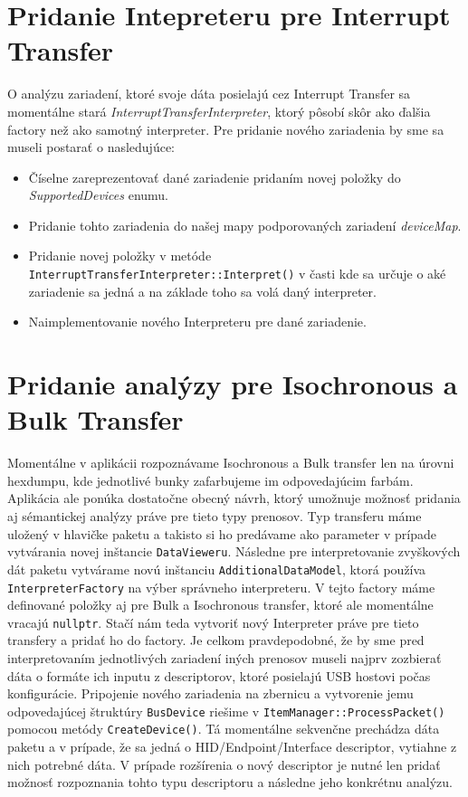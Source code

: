 \section{Pridanie Intepreteru pre Interrupt Transfer}
O analýzu zariadení, ktoré svoje dáta posielajú cez Interrupt Transfer sa momentálne stará \textit{InterruptTransferInterpreter}, ktorý pôsobí skôr ako ďalšia factory než ako samotný interpreter. Pre pridanie nového zariadenia by sme sa museli postarať o nasledujúce:
\begin{itemize}
\item Číselne zareprezentovať dané zariadenie pridaním novej položky do \textit{SupportedDevices} enumu.
\item Pridanie tohto zariadenia do našej mapy podporovaných zariadení \textit{deviceMap}.
\item Pridanie novej položky v metóde \newline\texttt{InterruptTransferInterpreter::Interpret()} v časti kde sa určuje o aké zariadenie sa jedná a na základe toho sa volá daný interpreter.
\item Naimplementovanie nového Interpreteru pre dané zariadenie.
\end{itemize}
\section{Pridanie analýzy pre Isochronous a Bulk \newline Transfer}
Momentálne v aplikácii rozpoznávame Isochronous a Bulk transfer len na úrovni hexdumpu, kde jednotlivé bunky zafarbujeme im odpovedajúcim farbám. Aplikácia ale ponúka dostatočne obecný návrh, ktorý umožnuje možnosť pridania aj sémantickej analýzy práve pre tieto typy prenosov. Typ transferu máme uložený v hlavičke paketu a takisto si ho predávame ako parameter v prípade vytvárania novej inštancie \texttt{DataVieweru}. Následne pre interpretovanie zvyškových dát paketu vytvárame novú inštanciu \texttt{AdditionalDataModel}, ktorá používa \texttt{InterpreterFactory} na výber správneho interpreteru. V tejto factory máme definované položky aj pre Bulk a Isochronous transfer, ktoré ale momentálne vracajú \texttt{nullptr}. Stačí nám teda vytvoriť nový Interpreter práve pre tieto transfery a pridať ho do factory. Je celkom pravdepodobné, že by sme pred interpretovaním jednotlivých zariadení iných prenosov museli najprv zozbierať dáta o formáte ich inputu z descriptorov, ktoré posielajú USB hostovi počas konfigurácie. Pripojenie nového zariadenia na zbernicu a vytvorenie jemu odpovedajúcej štruktúry \texttt{BusDevice} riešime v \texttt{ItemManager::ProcessPacket()} pomocou metódy \texttt{CreateDevice()}. Tá momentálne sekvenčne prechádza dáta paketu a v prípade, že sa jedná o HID/Endpoint/Interface descriptor, vytiahne z nich potrebné dáta. V prípade rozšírenia o nový descriptor je nutné len pridať možnosť rozpoznania tohto typu descriptoru a následne jeho konkrétnu analýzu.
